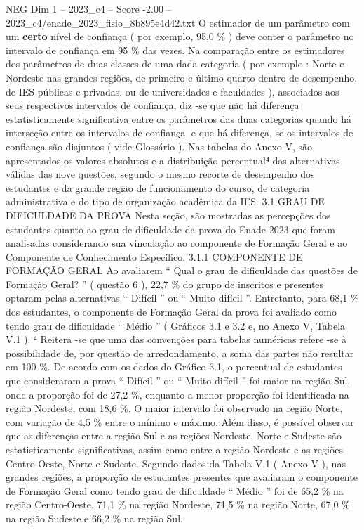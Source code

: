 \begin{textsample}{NEG Dim 1 – 2023\_c4 – Score -2.00 – 2023\_c4/enade\_2023\_fisio\_8b895e4d42.txt}
O estimador de um parâmetro com um \textbf{certo} nível de confiança ( por exemplo, 95,0 \% ) deve conter o parâmetro no intervalo de confiança em 95 \% das vezes.
Na comparação entre os estimadores dos parâmetros de duas classes de uma dada categoria ( por exemplo : Norte e Nordeste nas grandes regiões, de primeiro e último quarto dentro de desempenho, de IES públicas e privadas, ou de universidades e faculdades ), associados aos seus respectivos intervalos de confiança, diz -se que não há diferença estatisticamente significativa entre os parâmetros das duas categorias quando há interseção entre os intervalos de confiança, e que há diferença, se os intervalos de confiança são disjuntos ( vide Glossário ).
Nas tabelas do Anexo V, são apresentados os valores absolutos e a distribuição percentual⁴ das alternativas válidas das nove questões, segundo o mesmo recorte de desempenho dos estudantes e da grande região de funcionamento do curso, de categoria administrativa e do tipo de organização acadêmica da IES. 3.1 GRAU DE DIFICULDADE DA PROVA Nesta seção, são mostradas as percepções dos estudantes quanto ao grau de dificuldade da prova do Enade 2023 que foram analisadas considerando sua vinculação ao componente de Formação Geral e ao Componente de Conhecimento Específico. 3.1.1 COMPONENTE DE FORMAÇÃO GERAL Ao avaliarem “ Qual o grau de dificuldade das questões de Formação Geral? ” ( questão 6 ), 22,7 \% do grupo de inscritos e presentes optaram pelas alternativas “ Difícil ” ou “ Muito difícil ”.
Entretanto, para 68,1 \% dos estudantes, o componente de Formação Geral da prova foi avaliado como tendo grau de dificuldade “ Médio ” ( Gráficos 3.1 e 3.2 e, no Anexo V, Tabela V.1 ). ⁴ Reitera -se que uma das convenções para tabelas numéricas refere -se à possibilidade de, por questão de arredondamento, a soma das partes não resultar em 100 \%.
De acordo com os dados do Gráfico 3.1, o percentual de estudantes que consideraram a prova “ Difícil ” ou “ Muito difícil ” foi maior na região Sul, onde a proporção foi de 27,2 \%, enquanto a menor proporção foi identificada na região Nordeste, com 18,6 \%.
O maior intervalo foi observado na região Norte, com variação de 4,5 \% entre o mínimo e máximo.
Além disso, é possível observar que as diferenças entre a região Sul e as regiões Nordeste, Norte e Sudeste são estatisticamente significativas, assim como entre a região Nordeste e as regiões Centro-Oeste, Norte e Sudeste.
Segundo dados da Tabela V.1 ( Anexo V ), nas grandes regiões, a proporção de estudantes presentes que avaliaram o componente de Formação Geral como tendo grau de dificuldade “ Médio ” foi de 65,2 \% na região Centro-Oeste, 71,1 \% na região Nordeste, 71,5 \% na região Norte, 67,0 \% na região Sudeste e 66,2 \% na região Sul.

\end{textsample}
